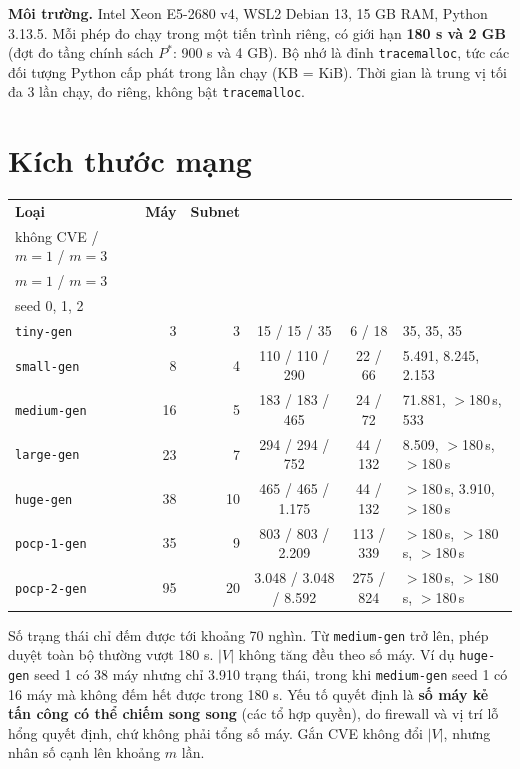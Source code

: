 \documentclass[11pt,a4paper]{article}
\begin{document}
\textbf{Môi trường.} Intel Xeon E5-2680 v4, WSL2 Debian 13, 15 GB RAM, Python 3.13.5. Mỗi phép đo chạy trong một tiến trình riêng, có giới hạn \textbf{180 s và 2 GB} (đợt đo tầng chính sách $P^{*}$: 900 s và 4 GB). Bộ nhớ là đỉnh \texttt{tracemalloc}, tức các đối tượng Python cấp phát trong lần chạy (KB = KiB). Thời gian là trung vị tối đa 3 lần chạy, đo riêng, không bật \texttt{tracemalloc}.

\section{Kích thước mạng}

\begin{center}
\small
\begin{tabular}{@{}lrrcc l@{}}
\toprule
\textbf{Loại} & \textbf{Máy} & \textbf{Subnet} & \shortstack{\textbf{Hành động}\\không CVE / $m{=}1$ / $m{=}3$} & \shortstack{\textbf{CVE@host}\\$m{=}1$ / $m{=}3$} & \shortstack[l]{\textbf{Số trạng thái $|V|$}\\seed 0, 1, 2} \\
\midrule
\texttt{tiny-gen} & 3 & 3 & 15 / 15 / 35 & 6 / 18 & 35, 35, 35 \\
\texttt{small-gen} & 8 & 4 & 110 / 110 / 290 & 22 / 66 & 5.491, 8.245, 2.153 \\
\texttt{medium-gen} & 16 & 5 & 183 / 183 / 465 & 24 / 72 & 71.881, $>$180\,s, 533 \\
\texttt{large-gen} & 23 & 7 & 294 / 294 / 752 & 44 / 132 & 8.509, $>$180\,s, $>$180\,s \\
\texttt{huge-gen} & 38 & 10 & 465 / 465 / 1.175 & 44 / 132 & $>$180\,s, 3.910, $>$180\,s \\
\texttt{pocp-1-gen} & 35 & 9 & 803 / 803 / 2.209 & 113 / 339 & $>$180\,s, $>$180\,s, $>$180\,s \\
\texttt{pocp-2-gen} & 95 & 20 & 3.048 / 3.048 / 8.592 & 275 / 824 & $>$180\,s, $>$180\,s, $>$180\,s \\
\bottomrule
\end{tabular}
\end{center}

Số trạng thái chỉ đếm được tới khoảng 70 nghìn. Từ \texttt{medium-gen} trở lên, phép duyệt toàn bộ thường vượt 180 s. $|V|$ không tăng đều theo số máy. Ví dụ \texttt{huge-gen} seed 1 có 38 máy nhưng chỉ 3.910 trạng thái, trong khi \texttt{medium-gen} seed 1 có 16 máy mà không đếm hết được trong 180 s. Yếu tố quyết định là \textbf{số máy kẻ tấn công có thể chiếm song song} (các tổ hợp quyền), do firewall và vị trí lỗ hổng quyết định, chứ không phải tổng số máy. Gắn CVE không đổi $|V|$, nhưng nhân số cạnh lên khoảng $m$ lần.
\end{document}
